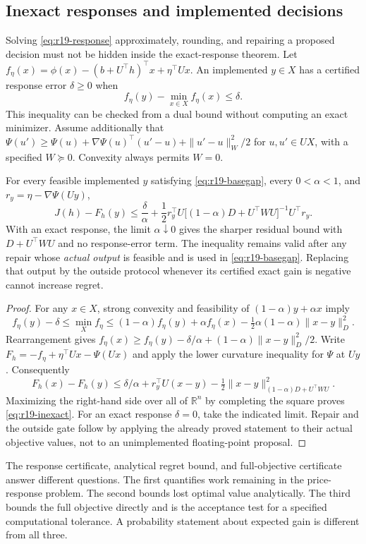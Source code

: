 \subsection{Inexact responses and implemented decisions}
Solving \eqref{eq:r19-response} approximately, rounding, and repairing a proposed decision must not be hidden inside the exact-response theorem. Let
$f_\eta(x)=\phi(x)-(b+U^\top h)^\top x+\eta^\top Ux$.
An implemented $y\in X$ has a certified response error $\delta\geq0$ when
\begin{equation}\label{eq:r19-basegap}
 f_\eta(y)-\min_{x\in X}f_\eta(x)\leq\delta.
\end{equation}
This inequality can be checked from a dual bound without computing an exact minimizer. Assume additionally that
$\Psi(u')\geq\Psi(u)+\nabla\Psi(u)^\top(u'-u)+\|u'-u\|_W^2/2$
for $u,u'\in UX$, with a specified $W\succeq0$. Convexity always permits $W=0$.

\begin{theorem}\label{thm:r19-inexact}
For every feasible implemented $y$ satisfying \eqref{eq:r19-basegap}, every $0<\alpha<1$, and $r_y=\eta-\nabla\Psi(Uy)$,
\begin{equation}\label{eq:r19-inexact}
 J(h)-F_h(y)\leq\frac{\delta}{\alpha}
 +\frac12r_y^\top U\big[(1-\alpha)D+U^\top WU\big]^{-1}U^\top r_y.
\end{equation}
With an exact response, the limit $\alpha\downarrow0$ gives the sharper residual bound with $D+U^\top WU$ and no response-error term. The inequality remains valid after any repair whose \emph{actual output} is feasible and is used in \eqref{eq:r19-basegap}. Replacing that output by the outside protocol whenever its certified exact gain is negative cannot increase regret.
\end{theorem}
\begin{proof}
For any $x\in X$, strong convexity and feasibility of $(1-\alpha)y+\alpha x$ imply
\[
 f_\eta(y)-\delta\leq\min_X f_\eta
 \leq(1-\alpha)f_\eta(y)+\alpha f_\eta(x)
 -\tfrac12\alpha(1-\alpha)\|x-y\|_D^2.
\]
Rearrangement gives
$f_\eta(x)\geq f_\eta(y)-\delta/\alpha+(1-\alpha)\|x-y\|_D^2/2$.
Write $F_h=-f_\eta+\eta^\top Ux-\Psi(Ux)$ and apply the lower curvature inequality for $\Psi$ at $Uy$. Consequently
\[
 F_h(x)-F_h(y)\leq\delta/\alpha+r_y^\top U(x-y)
 -\tfrac12\|x-y\|_{(1-\alpha)D+U^\top WU}^2.
\]
Maximizing the right-hand side over all of $\mathbb R^n$ by completing the square proves \eqref{eq:r19-inexact}. For an exact response $\delta=0$, take the indicated limit. Repair and the outside gate follow by applying the already proved statement to their actual objective values, not to an unimplemented floating-point proposal.
\end{proof}
The response certificate, analytical regret bound, and full-objective certificate answer different questions. The first quantifies work remaining in the price-response problem. The second bounds lost optimal value analytically. The third bounds the full objective directly and is the acceptance test for a specified computational tolerance. A probability statement about expected gain is different from all three.

